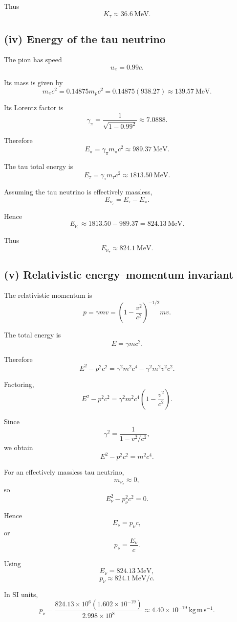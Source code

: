 \documentclass[11pt,a4paper]{article}
\begin{document}
Thus
\[
\boxed{K_\tau\approx36.6\ \mathrm{MeV}}.
\]

\subsection{(iv) Energy of the tau neutrino}

The pion has speed
\[
u_\pi=0.99c.
\]

Its mass is given by
\[
m_\pi c^2
=
0.14875m_pc^2
=
0.14875(938.27)
\approx139.57\ \mathrm{MeV}.
\]

Its Lorentz factor is
\[
\gamma_\pi
=
\frac{1}{\sqrt{1-0.99^2}}
\approx7.0888.
\]

Therefore
\[
E_\pi
=
\gamma_\pi m_\pi c^2
\approx989.37\ \mathrm{MeV}.
\]

The tau total energy is
\[
E_\tau
=
\gamma_\tau m_\tau c^2
\approx1813.50\ \mathrm{MeV}.
\]

Assuming the tau neutrino is effectively massless,
\[
E_{\nu_\tau}
=
E_\tau-E_\pi.
\]

Hence
\[
E_{\nu_\tau}
\approx1813.50-989.37
=
824.13\ \mathrm{MeV}.
\]

Thus
\[
\boxed{E_{\nu_\tau}\approx824.1\ \mathrm{MeV}}.
\]

\subsection{(v) Relativistic energy--momentum invariant}

The relativistic momentum is
\[
p=\gamma mv
=
\left(1-\frac{v^2}{c^2}\right)^{-1/2}mv.
\]

The total energy is
\[
E=\gamma mc^2.
\]

Therefore
\[
E^2-p^2c^2
=
\gamma^2m^2c^4
-
\gamma^2m^2v^2c^2.
\]

Factoring,
\[
E^2-p^2c^2
=
\gamma^2m^2c^4
\left(1-\frac{v^2}{c^2}\right).
\]

Since
\[
\gamma^2=
\frac{1}{1-v^2/c^2},
\]
we obtain
\[
\boxed{E^2-p^2c^2=m^2c^4}.
\]

For an effectively massless tau neutrino,
\[
m_{\nu_\tau}\approx0,
\]
so
\[
E_\nu^2-p_\nu^2c^2=0.
\]

Hence
\[
E_\nu=p_\nu c,
\]
or
\[
p_\nu=\frac{E_\nu}{c}.
\]

Using
\[
E_\nu=824.13\ \mathrm{MeV},
\]
\[
\boxed{p_\nu\approx824.1\ \mathrm{MeV}/c}.
\]

In SI units,
\[
p_\nu
=
\frac{824.13\times10^6(1.602\times10^{-19})}
{2.998\times10^8}
\approx4.40\times10^{-19}\ \mathrm{kg\,m\,s^{-1}}.
\]
\end{document}
